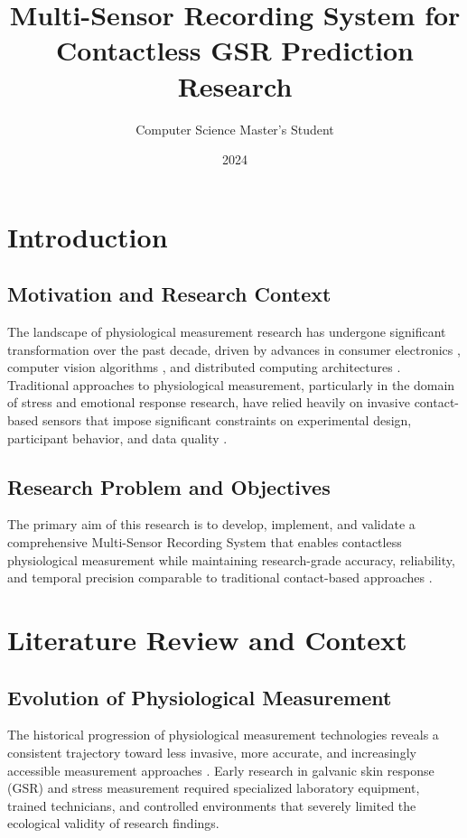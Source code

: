 \documentclass[11pt,a4paper]{report}
\title{Multi-Sensor Recording System for Contactless GSR Prediction Research}
\author{Computer Science Master's Student}
\date{2024}
\begin{document}
\maketitle
\tableofcontents
\newpage

\chapter{Introduction}

\section{Motivation and Research Context}

The landscape of physiological measurement research has undergone significant transformation over the past decade,
driven by advances in consumer electronics \cite{Apple2019, Samsung2020}, computer vision
algorithms \cite{Goodfellow2016, LeCun2015}, and distributed computing architectures \cite{Lamport1978, Dean2008}. Traditional
approaches to physiological measurement, particularly in the domain of stress and emotional response research, have
relied heavily on invasive contact-based sensors that impose significant constraints on experimental design, participant
behavior, and data quality \cite{Boucsein2012, Healey2005}.

\section{Research Problem and Objectives}

The primary aim of this research is to develop, implement, and validate a comprehensive Multi-Sensor Recording System
that enables contactless physiological measurement while maintaining research-grade accuracy, reliability, and temporal
precision comparable to traditional contact-based approaches \cite{Wilson2014}.

\chapter{Literature Review and Context}

\section{Evolution of Physiological Measurement}

The historical progression of physiological measurement technologies reveals a consistent trajectory toward less
invasive, more accurate, and increasingly accessible measurement approaches \cite{Boucsein2012, Fowles1981}. Early research
in galvanic skin response (GSR) and stress measurement required specialized laboratory equipment, trained
technicians, and controlled environments that severely limited the ecological validity of research findings.
\end{document}
